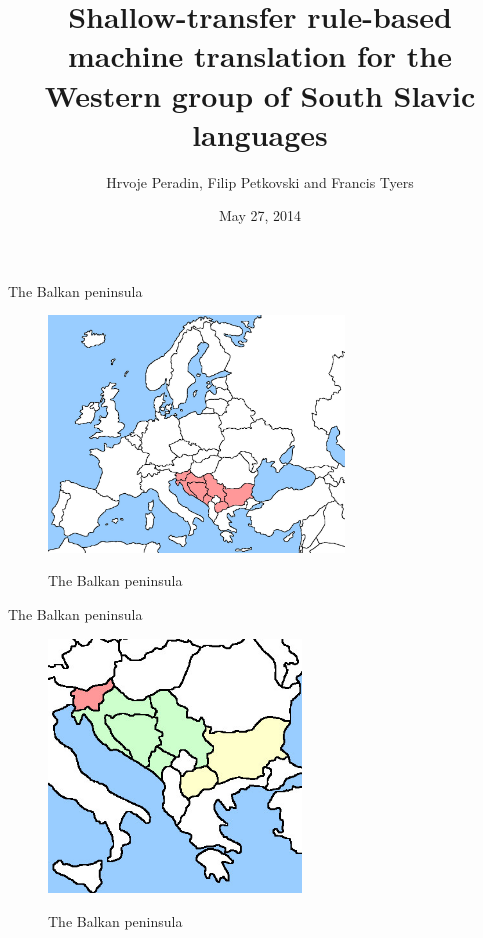 \documentclass{beamer}
\title{Shallow-transfer rule-based machine translation for the Western group of South Slavic languages}
\author{
	Hrvoje Peradin, Filip Petkovski and Francis Tyers
}
\date{May 27, 2014}
\begin{document}
\begin{frame}
  \titlepage
\end{frame}

\begin{frame}{The Balkan peninsula}
\begin{center}
	\begin{figure}
	\includegraphics[width=0.7\textwidth]{images/europe.jpg}
	\label{fig:1}
	\caption{The Balkan peninsula}
	\end{figure}
\end{center}
\end{frame}

\begin{frame}{The Balkan peninsula}
\begin{center}
	\begin{figure}
	\includegraphics[width=0.6\textwidth]{images/balkans.jpg}
	\label{fig:1}
	\caption{The Balkan peninsula}
	\end{figure}
\end{center}
\end{frame}
\end{document}
